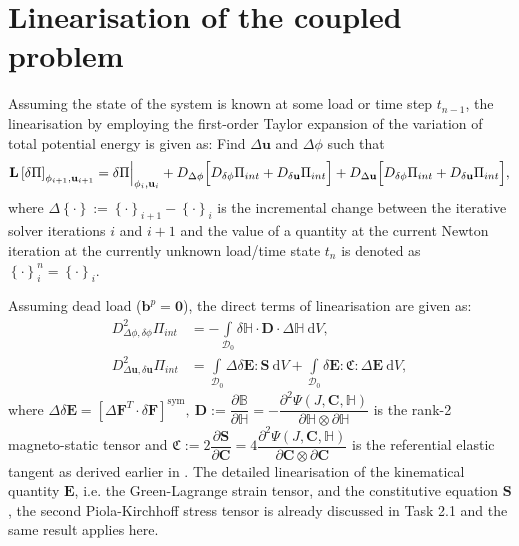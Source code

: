\section{Linearisation of the coupled problem}
Assuming the state of the system is known at some load or time step $t_{n-1}$, the linearisation by employing the first-order Taylor expansion of the variation of total potential energy is given as: Find $\Delta \mathbf{u}$ and $\Delta \phi$ such that
\begin{equation}
\mathbf{L} \left[ \delta \Pi \right]_{\phi_{i+1}, \mathbf{u}_{i+1}} = \delta \Pi \Big{|}_{\phi_i, \mathbf{u}_i} + D_{\Delta \phi} \Big[ D_{\delta \phi} \Pi_{int} + D_{\delta \mathbf{u}} \Pi_{int} \Big] + D_{\Delta \mathbf{u}} \Big[ D_{\delta \phi} \Pi_{int} + D_{\delta \mathbf{u}} \Pi_{int} \Big],
\label{eq:3.29}
\end{equation} 
where $\Delta \left\lbrace \cdot \right\rbrace := \left\lbrace \cdot \right\rbrace_{i+1} - \left\lbrace \cdot \right\rbrace_i$ is the incremental change between the iterative solver iterations $i$ and $i+1$ and the value of a quantity at the current Newton iteration at the currently unknown load/time state $t_n$ is denoted as $\left\lbrace \cdot \right\rbrace_i^n = \left\lbrace \cdot \right\rbrace_i$.

Assuming dead load ($\mathbf{b}^p = \mathbf{0}$), the direct terms of linearisation are given as:
\begin{align}
D^2_{\Delta \phi, \delta \phi} \Pi_{int} &= - \int\limits_{\mathcal{D}_0} \delta \mathbb{H} \cdot \mathbf{D} \cdot \Delta \mathbb{H} \ \mathrm{d}V, \label{eq:3.30.1}\\
D^2_{\Delta \mathbf{u}, \delta \mathbf{u}} \Pi_{int} &= \int\limits_{\mathcal{D}_0} \Delta \delta \mathbf{E} : \mathbf{S} \ \mathrm{d}V + \int\limits_{\mathcal{D}_0} \delta \mathbf{E} : \mathfrak{C} : \Delta \mathbf{E} \ \mathrm{d}V, \label{eq:3.30.2}
\end{align}
where $\Delta \delta \mathbf{E} = \left[ \Delta \mathbf{F}^T \cdot \delta \mathbf{F} \right]^{\text{sym}}, \ \mathbf{D} := \dfrac{\partial \mathbb{B}}{\partial \mathbb{H}} = -\dfrac{\partial^2 \Psi (J, \mathbf{C}, \mathbb{H})}{\partial \mathbb{H} \otimes \partial \mathbb{H}}$ is the rank-2 magneto-static tensor and $\mathfrak{C} := 2\dfrac{\partial \mathbf{S}}{\partial \mathbf{C}} = 4\dfrac{\partial^2 \Psi (J, \mathbf{C}, \mathbb{H})}{\partial \mathbf{C} \otimes \partial \mathbf{C}}$ is the referential elastic tangent as derived earlier in . The detailed linearisation of the kinematical quantity $\mathbf{E}$, i.e. the Green-Lagrange strain tensor, and the constitutive equation $\mathbf{S}$, the second Piola-Kirchhoff stress tensor is already discussed in Task 2.1 and the same result applies here. \par 

